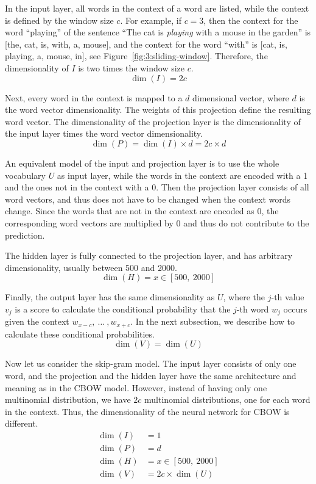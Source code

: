 In the input layer, all words in the context of a word are listed, while the context is defined by the window size $c$. For example, if $c=3$, then the context for the word ``playing'' of the sentence ``The cat is \emph{playing} with a mouse in the garden'' is [the, cat, is, with, a, mouse], and the context for the word ``with'' is [cat, is, playing, a, mouse, in], see Figure~\ref{fig:3:sliding-window}. Therefore, the dimensionality of $I$ is two times the window size $c$.
\begin{displaymath}
\dim(I) = 2c
\end{displaymath}

Next, every word in the context is mapped to a $d$ dimensional vector, where $d$ is the word vector dimensionality. The weights of this projection define the resulting word vector. The dimensionality of the projection layer is the dimensionality of the input layer times the word vector dimensionality.
\begin{displaymath}
\dim(P) = \dim(I) \times d = 2c \times d
\end{displaymath}

An equivalent model of the input and projection layer is to use the whole vocabulary $U$ as input layer, while the words in the context are encoded with a 1 and the ones not in the context with a 0. Then the projection layer consists of all word vectors, and thus does not have to be changed when the context words change. Since the words that are not in the context are encoded as 0, the corresponding word vectors are multiplied by 0 and thus do not contribute to the prediction.

The hidden layer is fully connected to the projection layer, and has arbitrary dimensionality, usually between 500 and 2000.
\begin{displaymath}
\dim(H) = x \in [500,\ 2000]
\end{displaymath}

Finally, the output layer has the same dimensionality as $U$, where the $j$-th value $v_{j}$ is a score to calculate the conditional probability that the $j$-th word $w_{j}$ occurs given the context $w_{x - c},\ \ldots\ ,w_{x + c}$. In the next subsection, we describe how to calculate these conditional probabilities.
\begin{displaymath}
\dim(V) = \dim(U)
\end{displaymath}

Now let us consider the skip-gram model. The input layer consists of only one word, and the projection and the hidden layer have the same architecture and meaning as in the CBOW model. However, instead of having only one multinomial distribution, we have $2c$ multinomial distributions, one for each word in the context. Thus, the dimensionality of the neural network for CBOW is different.
\begin{displaymath}
\begin{aligned}
\dim(I) &= 1 \\
\dim(P) &= d \\
\dim(H) &= x \in [500,\ 2000] \\
\dim(V) &= 2c \times \dim(U)
\end{aligned}
\end{displaymath}

